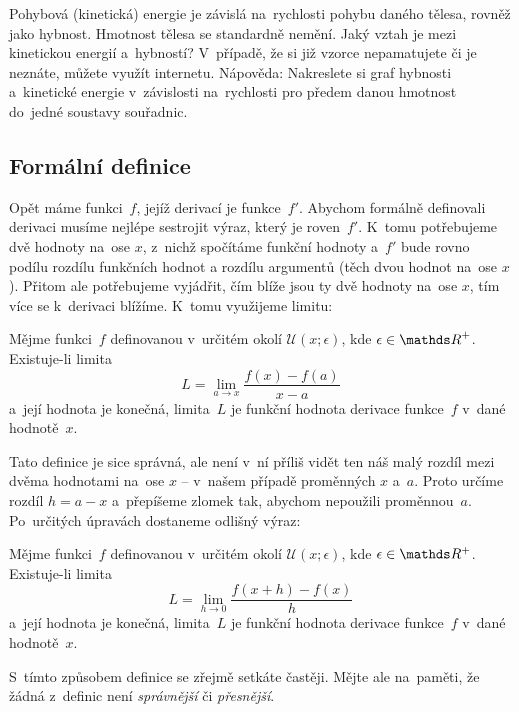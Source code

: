 \begin{exercise}
    Pohybová (kinetická) energie je závislá na~rychlosti pohybu daného tělesa, rovněž
    jako hybnost. Hmotnost tělesa se standardně nemění. Jaký vztah je mezi kinetickou
    energií a~hybností? V~případě, že si již vzorce nepamatujete či je neznáte,
    můžete využít internetu. Nápověda: Nakreslete si graf hybnosti a~kinetické
    energie v~závislosti na~rychlosti pro předem danou hmotnost do~jedné soustavy
    souřadnic.
\end{exercise}

\subsection{Formální definice}
\label{subsec:derivace-definice-formal}

Opět máme funkci~$f$, jejíž derivací je funkce~$f'$. Abychom formálně definovali
derivaci musíme nejlépe sestrojit výraz, který je roven~$f'$. K~tomu potřebujeme dvě
hodnoty na~ose $x$, z~nichž spočítáme funkční hodnoty a~$f'$ bude rovno podílu
rozdílu funkčních hodnot a rozdílu argumentů (těch dvou hodnot na~ose $x$). Přitom
ale potřebujeme vyjádřit, čím blíže jsou ty dvě hodnoty na~ose $x$, tím více se
k~derivaci blížíme. K~tomu využijeme limitu:

\begin{definition}
    Mějme funkci~$f$ definovanou v~určitém okolí ${\mathcal{U}(x; \epsilon)}$, kde
    ${\epsilon \in \positive\reals}$. Existuje-li limita
    \begin{equation*}
        L = \lim_{a \to x} \frac{f(x) - f(a)}{x - a}
    \end{equation*}
    a~její hodnota je konečná, limita~$L$ je funkční hodnota derivace funkce~$f$
    v~dané hodnotě~$x$.
\end{definition}

Tato definice je sice správná, ale není v~ní příliš vidět ten náš malý rozdíl mezi
dvěma hodnotami na~ose $x$ -- v~našem případě proměnných $x$ a~$a$. Proto určíme
rozdíl $h = a - x$ a~přepíšeme zlomek tak, abychom nepoužili proměnnou~$a$.
Po~určitých úpravách dostaneme odlišný výraz:

\begin{definition}
    Mějme funkci~$f$ definovanou v~určitém okolí ${\mathcal{U}(x; \epsilon)}$, kde
    ${\epsilon \in \reals^{+}}$. Existuje-li limita
    \begin{equation*}
        L = \lim_{h \to 0} \frac{f(x + h) - f(x)}{h}
    \end{equation*}
    a~její hodnota je konečná, limita~$L$ je funkční hodnota derivace funkce~$f$
    v~dané hodnotě~$x$.
\end{definition}

S~tímto způsobem definice se zřejmě setkáte častěji. Mějte ale na~paměti, že žádná
z~definic není \emph{správnější} či \emph{přesnější}.
